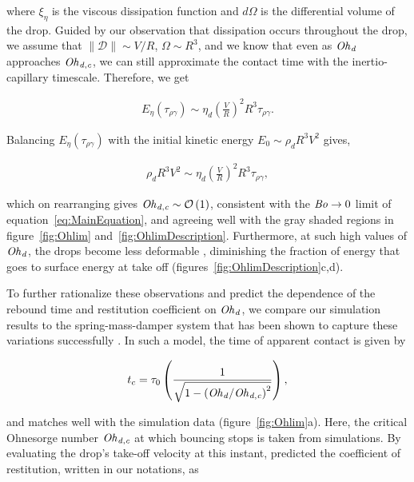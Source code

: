 \noindent where $\xi_\eta$ is the viscous dissipation function and $d\Omega$ is the differential volume of the drop. Guided by our observation that dissipation occurs throughout the drop, we assume that $\|\boldsymbol{\mathcal{D}}\| \sim V/R$, $\Omega \sim R^3$, and we know that even as $\mathit{Oh}_\mathit{d}$ approaches $\mathit{Oh}_\mathit{d,c}$, we can still approximate the contact time with the inertio-capillary timescale. Therefore, we get

\begin{align}
	E_\eta(\tau_{\rho\gamma}) \sim \eta_d\left(\frac{V}{R}\right)^2R^3\tau_{\rho\gamma}.
\end{align}

\noindent Balancing $E_\eta\left(\tau_{\rho\gamma}\right)$ with the initial kinetic energy $E_0 \sim \rho_dR^3V^2$ gives,

\begin{align}
	\rho_dR^3V^2 \sim  \eta_d\left(\frac{V}{R}\right)^2R^3\tau_{\rho\gamma},
\end{align}

\noindent which on rearranging gives $\mathit{Oh}_\mathit{d,c} \sim \mathcal{O}\left(1\right)$, consistent with the $\mathit{Bo} \to 0$ limit of equation~\eqref{eq:MainEquation}, and agreeing well with the gray shaded regions in figure~\ref{fig:Ohlim} and~\ref{fig:OhlimDescription}. Furthermore, at such high values of $\mathit{Oh}_\mathit{d}$, the drops become less deformable \citep{galeano2021capillary}, diminishing the fraction of energy that goes to surface energy at take off (figures~\ref{fig:OhlimDescription}c,d).

To further rationalize these observations and predict the dependence of the rebound time and restitution coefficient on $\mathit{Oh}_\mathit{d}$, we compare our simulation results to the spring-mass-damper system that has been shown to capture these variations successfully \citep{jha2020viscous, vatsalInProgressFilms}. In such a model, the time of apparent contact is given by

\begin{align}
	\label{eqn:JhaEtAl_time}
	t_c =  \tau_0\left(\frac{1}{\sqrt{1 - \left(\mathit{Oh}_\mathit{d}/\mathit{Oh}_\mathit{d,c}\right)^{2}}}\right),
\end{align}

\noindent and matches well with the simulation data (figure~\ref{fig:Ohlim}a). Here, the critical Ohnesorge number $\mathit{Oh}_\mathit{d,c}$ at which bouncing stops is taken from simulations. By evaluating the drop's take-off velocity at this instant, \citet{jha2020viscous} predicted the coefficient of restitution, written in our notations, as

